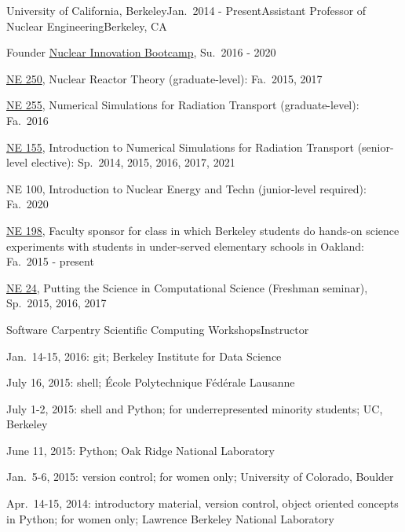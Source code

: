 \begin{rSubsection}{University of California, Berkeley}{Jan.\ 2014 - Present}{Assistant Professor of Nuclear Engineering}{Berkeley, CA}
\item Founder \href{https://www.nuclearinnovationbootcamp.org/}{Nuclear
Innovation Bootcamp}, Su.\ 2016 - 2020 
\item \href{https://github.com/rachelslaybaugh/NE250}{NE 250}, Nuclear Reactor Theory (graduate-level): Fa.\ 2015, 2017
\item \href{https://github.com/rachelslaybaugh/NE255}{NE 255}, Numerical Simulations for Radiation Transport (graduate-level): Fa.\ 2016
\item \href{https://github.com/rachelslaybaugh/NE155}{NE 155}, Introduction to
Numerical Simulations for Radiation Transport (senior-level elective): Sp.\
2014, 2015, 2016, 2017, 2021
\item NE 100, Introduction to Nuclear Energy and Techn (junior-level required):
Fa.\ 2020 
\item \href{http://soesberkeley.weebly.com/}{NE 198}, Faculty sponsor for class
in which Berkeley students do hands-on science experiments with students in
under-served elementary schools in Oakland: Fa.\ 2015 - present
\item \href{https://github.com/rachelslaybaugh/NE24}{NE 24}, Putting the Science in Computational Science (Freshman seminar), Sp.\ 2015, 2016, 2017
\end{rSubsection}


\begin{rSubsection}{Software Carpentry Scientific Computing Workshops}{}{Instructor}{}
\item Jan.\ 14-15, 2016: git; Berkeley Institute for Data Science
\item July 16, 2015: shell; \'{E}cole Polytechnique F\'{e}d\'{e}rale Lausanne
\item July 1-2, 2015: shell and Python; for underrepresented minority students; UC, Berkeley
\item June 11, 2015: Python; Oak Ridge National Laboratory
\item Jan.\ 5-6, 2015: version control; for women only; University of Colorado, Boulder
\item Apr.\ 14-15, 2014: introductory material, version control, object oriented concepts in Python; for women only; Lawrence Berkeley National Laboratory
\end{rSubsection}


